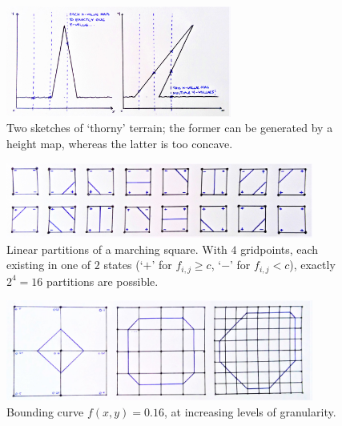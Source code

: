 \documentclass[a4paper, 11pt]{article}
\begin{document}
\begin{flushleft}
\begin{figure}[h]
\centering
\includegraphics[width=0.66\textwidth]{Concave Terrain}
\caption{Two sketches of `thorny' terrain; the former can be generated by a height map, whereas the latter is too concave.}
\label{Concave Terrain}
\end{figure}

\begin{figure}[t]
\centering
\includegraphics[width=0.9\textwidth]{Marching Square Partitions}
\caption{Linear partitions of a marching square. With $4$ gridpoints, each existing in one of $2$ states (`$+$' for $f_{i,j} \geqslant c$, `$-$' for $f_{i,j} < c$), exactly $2^4 = 16$ partitions are possible.} %
\label{Marching Square Partitions}
\end{figure}

\begin{figure}[t]
\centering
\includegraphics[width=0.9\textwidth]{Marching Squares}
\caption{Bounding curve $f(x,y) = 0.16$, at increasing levels of granularity.}
\label{Marching Squares}
\end{figure}



\end{flushleft}
\end{document}
